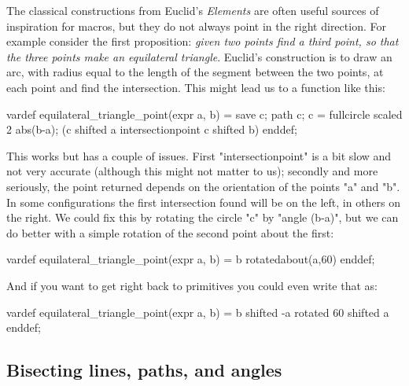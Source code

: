 \documentclass[a4paper,landscape]{article}
\begin{document}
The classical constructions from Euclid's \textsl{Elements} are often useful 
sources of inspiration for macros, but they do not always point in the right 
direction.  For example consider the first proposition: \textit{given two points
find a third point, so that the three points make an equilateral triangle}.
Euclid's construction is to draw an arc, with radius equal to the length of the
segment between the two points, at each point and find the intersection.  This might 
lead us to a function like this:
\begin{code}
vardef equilateral_triangle_point(expr a, b) =
  save c; path c; c = fullcircle scaled 2 abs(b-a); 
  (c shifted a intersectionpoint c shifted b)
enddef;
\end{code}
This works but has a couple of issues.  First "intersectionpoint" is a bit slow and
not very accurate (although this might not matter to us); secondly and more
seriously, the point returned depends on the orientation of the points "a" and 
"b".  In some configurations the first intersection found will be on the left, in
others on the right.  We could fix this by rotating the circle "c" by "angle (b-a)",
but  we can do better with a simple rotation of the second point about the first:
\begin{code}
vardef equilateral_triangle_point(expr a, b) =
  b rotatedabout(a,60)
enddef;
\end{code}
And if you want to get right back to primitives you could even write that as:
\begin{code}
vardef equilateral_triangle_point(expr a, b) =
  b shifted -a rotated 60 shifted a
enddef;
\end{code}

\newpage
\subsection{Bisecting lines, paths, and angles}
\end{document}
